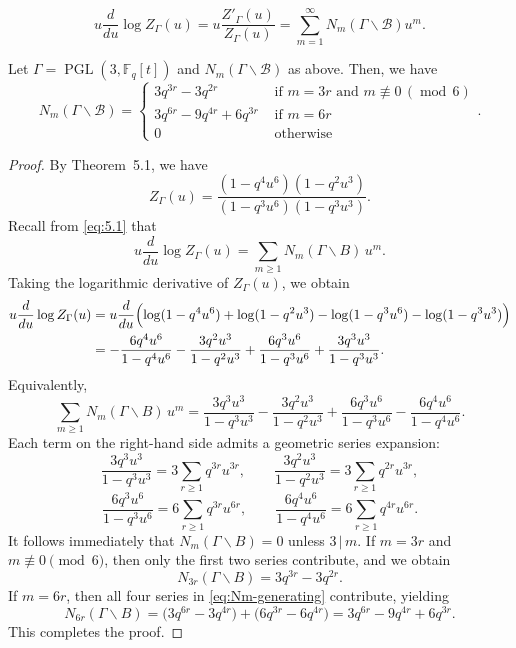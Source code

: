 \documentclass[10pt,a4paper]{amsart}
\begin{document}
\begin{equation}\label{eq:5.1}
u\frac{d}{du}\log Z_{\Gamma}(u)=u\frac{Z'_{\Gamma}(u)}{Z_{\Gamma}(u)}=\sum_{m=1}^{\infty} N_m(\Gamma\backslash \mathcal{B})u^m.
\end{equation}

\begin{coro} Let $\Gamma=\operatorname{PGL}(3,\mathbb{F}_q[t])$ and $N_m(\Gamma\backslash\mathcal{B})$ as above. Then, we have
$$N_m(\Gamma\backslash\mathcal{B})=\left\{\begin{array}{ll}3q^{3r}-3q^{2r} & \textrm{ if }m=3r\textrm{ and }m\not\equiv 0 \,(\operatorname{mod}\,{6}) \\ 
3q^{6r}-9q^{4r}+6q^{3r} & \textrm{ if }m=6r \\ 0 
& \textrm{ otherwise}\end{array}\right..$$
\end{coro}

\begin{proof}
By Theorem~5.1, we have
\[
Z_\Gamma(u)
=
\frac{(1-q^{4}u^{6})(1-q^{2}u^{3})}{(1-q^{3}u^{6})(1-q^{3}u^{3})}.
\]
Recall from \eqref{eq:5.1} that
\[
u\frac{d}{du}\log Z_\Gamma(u)
=
\sum_{m\ge1} N_m(\Gamma\backslash B)\,u^m.
\]
Taking the logarithmic derivative of $Z_\Gamma(u)$, we obtain
\begin{align*}
u\frac{d}{du}\log Z_\Gamma(u)
&=
u\frac{d}{du}\Bigl(
\log(1-q^{4}u^{6})
+
\log(1-q^{2}u^{3})
-
\log(1-q^{3}u^{6})
-
\log(1-q^{3}u^{3})
\Bigr) \\
&=
-\frac{6q^{4}u^{6}}{1-q^{4}u^{6}}
-\frac{3q^{2}u^{3}}{1-q^{2}u^{3}}
+\frac{6q^{3}u^{6}}{1-q^{3}u^{6}}
+\frac{3q^{3}u^{3}}{1-q^{3}u^{3}}.
\end{align*}
Equivalently,
\begin{equation}\label{eq:Nm-generating}
\sum_{m\ge1} N_m(\Gamma\backslash B)\,u^m
=
\frac{3q^{3}u^{3}}{1-q^{3}u^{3}}
-
\frac{3q^{2}u^{3}}{1-q^{2}u^{3}}
+
\frac{6q^{3}u^{6}}{1-q^{3}u^{6}}
-
\frac{6q^{4}u^{6}}{1-q^{4}u^{6}}.
\end{equation}
Each term on the right-hand side admits a geometric series expansion:
\[
\frac{3q^{3}u^{3}}{1-q^{3}u^{3}}
=
3\sum_{r\ge1} q^{3r}u^{3r},
\qquad
\frac{3q^{2}u^{3}}{1-q^{2}u^{3}}
=
3\sum_{r\ge1} q^{2r}u^{3r},
\]
\[
\frac{6q^{3}u^{6}}{1-q^{3}u^{6}}
=
6\sum_{r\ge1} q^{3r}u^{6r},
\qquad
\frac{6q^{4}u^{6}}{1-q^{4}u^{6}}
=
6\sum_{r\ge1} q^{4r}u^{6r}.
\]
It follows immediately that $N_m(\Gamma\backslash B)=0$ unless $3\,|\, m$.
If $m=3r$ and $m\not\equiv 0 \pmod{6}$, then only the first two series contribute,
and we obtain
\[
N_{3r}(\Gamma\backslash B)
=
3q^{3r}-3q^{2r}.
\]
If $m=6r$, then all four series in \eqref{eq:Nm-generating} contribute, yielding
\[
N_{6r}(\Gamma\backslash B)
=
\bigl(3q^{6r}-3q^{4r}\bigr)
+
\bigl(6q^{3r}-6q^{4r}\bigr)
=
3q^{6r}-9q^{4r}+6q^{3r}.
\]
This completes the proof.
\end{proof}
\end{document}
